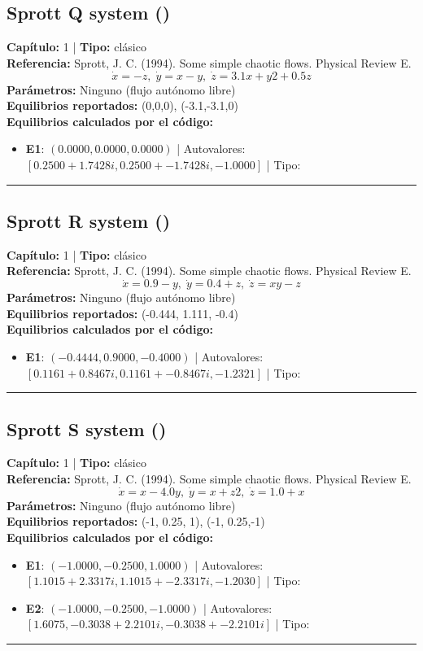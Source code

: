 \subsection*{Sprott Q system ()}
\textbf{Capítulo:} 1 | \textbf{Tipo:} clásico\\
\textbf{Referencia:} Sprott, J. C. (1994). Some simple chaotic flows. Physical Review E.\\
\[\dot{x}=-z, \; \dot{y}=x-y, \; \dot{z}=3.1x+y2+0.5z\]
\textbf{Parámetros:} Ninguno (flujo autónomo libre)\\
\textbf{Equilibrios reportados:} (0,0,0), (-3.1,-3.1,0)\\
\textbf{Equilibrios calculados por el código:}
\begin{itemize}
  \item \textbf{E1}: $(0.0000, 0.0000, 0.0000)$ | Autovalores: $[0.2500 + 1.7428i, 0.2500 + -1.7428i, -1.0000]$ | Tipo: 
\end{itemize}
\hrule

\subsection*{Sprott R system ()}
\textbf{Capítulo:} 1 | \textbf{Tipo:} clásico\\
\textbf{Referencia:} Sprott, J. C. (1994). Some simple chaotic flows. Physical Review E.\\
\[\dot{x}=0.9-y, \; \dot{y}=0.4+z, \; \dot{z}=xy-z\]
\textbf{Parámetros:} Ninguno (flujo autónomo libre)\\
\textbf{Equilibrios reportados:} (-0.444, 1.111, -0.4)\\
\textbf{Equilibrios calculados por el código:}
\begin{itemize}
  \item \textbf{E1}: $(-0.4444, 0.9000, -0.4000)$ | Autovalores: $[0.1161 + 0.8467i, 0.1161 + -0.8467i, -1.2321]$ | Tipo: 
\end{itemize}
\hrule

\subsection*{Sprott S system ()}
\textbf{Capítulo:} 1 | \textbf{Tipo:} clásico\\
\textbf{Referencia:} Sprott, J. C. (1994). Some simple chaotic flows. Physical Review E.\\
\[\dot{x}=x-4.0y, \; \dot{y}=x+z2, \; \dot{z}=1.0+x\]
\textbf{Parámetros:} Ninguno (flujo autónomo libre)\\
\textbf{Equilibrios reportados:} (-1, 0.25, 1), (-1, 0.25,-1)\\
\textbf{Equilibrios calculados por el código:}
\begin{itemize}
  \item \textbf{E1}: $(-1.0000, -0.2500, 1.0000)$ | Autovalores: $[1.1015 + 2.3317i, 1.1015 + -2.3317i, -1.2030]$ | Tipo: 
  \item \textbf{E2}: $(-1.0000, -0.2500, -1.0000)$ | Autovalores: $[1.6075, -0.3038 + 2.2101i, -0.3038 + -2.2101i]$ | Tipo: 
\end{itemize}
\hrule

